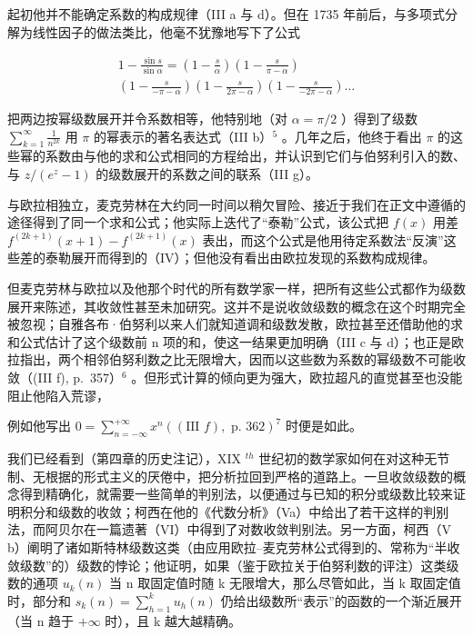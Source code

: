 起初他并不能确定系数的构成规律（III a 与 d）。但在 1735 年前后，与多项式分解为线性因子的做法类比，他毫不犹豫地写下了公式

\[
\begin{array}{c} 1 - \frac {\sin s}{\sin \alpha} = \left(1 - \frac {s}{\alpha}\right) \left(1 - \frac {s}{\pi - \alpha}\right) \\ \left(1 - \frac {s}{- \pi - \alpha}\right) \left(1 - \frac {s}{2 \pi - \alpha}\right) \left(1 - \frac {s}{- 2 \pi - \alpha}\right) \dots \end{array}
\]

把两边按幂级数展开并令系数相等，他特别地（对 \(\alpha = \pi/2\) ）得到了级数 \(\sum_{k=1}^{\infty} \frac{1}{n^{2k}}\) 用 \(\pi\) 的幂表示的著名表达式（III b）\(^{5}\) 。几年之后，他终于看出 \(\pi\) 的这些幂的系数由与他的求和公式相同的方程给出，并认识到它们与伯努利引入的数、与 \(z/(e^{z} - 1)\) 的级数展开的系数之间的联系（III g）。

与欧拉相独立，麦克劳林在大约同一时间以稍欠冒险、接近于我们在正文中遵循的途径得到了同一个求和公式；他实际上迭代了“泰勒”公式，该公式把 \(f(x)\) 用差 \(f^{(2k+1)}(x+1)-f^{(2k+1)}(x)\) 表出，而这个公式是他用待定系数法“反演”这些差的泰勒展开而得到的（IV）；但他没有看出由欧拉发现的系数构成规律。

但麦克劳林与欧拉以及他那个时代的所有数学家一样，把所有这些公式都作为级数展开来陈述，其收敛性甚至未加研究。这并不是说收敛级数的概念在这个时期完全被忽视；自雅各布·伯努利以来人们就知道调和级数发散，欧拉甚至还借助他的求和公式估计了这个级数前 n 项的和，使这一结果更加明确（III c 与 d）；也正是欧拉指出，两个相邻伯努利数之比无限增大，因而以这些数为系数的幂级数不可能收敛（(III f), p.~357）\(^{6}\) 。但形式计算的倾向更为强大，欧拉超凡的直觉甚至也没能阻止他陷入荒谬，

例如他写出 \(0 = \sum_{n=-\infty}^{+\infty} x^n ((\text{III } f), \text{ p. 362})^7\) 时便是如此。

我们已经看到（第四章的历史注记），XIX \(^{th}\) 世纪初的数学家如何在对这种无节制、无根据的形式主义的厌倦中，把分析拉回到严格的道路上。一旦收敛级数的概念得到精确化，就需要一些简单的判别法，以便通过与已知的积分或级数比较来证明积分和级数的收敛；柯西在他的《代数分析》（Va）中给出了若干这样的判别法，而阿贝尔在一篇遗著（VI）中得到了对数收敛判别法。另一方面，柯西（V b）阐明了诸如斯特林级数这类（由应用欧拉–麦克劳林公式得到的、常称为“半收敛级数”的）级数的悖论；他证明，如果（鉴于欧拉关于伯努利数的评注）这类级数的通项 \(u_{k}(n)\) 当 n 取固定值时随 k 无限增大，那么尽管如此，当 k 取固定值时，部分和 \(s_{k}(n) = \sum_{h=1}^{k} u_{h}(n)\) 仍给出级数所“表示”的函数的一个渐近展开（当 n 趋于 \(+\infty\) 时），且 k 越大越精确。

